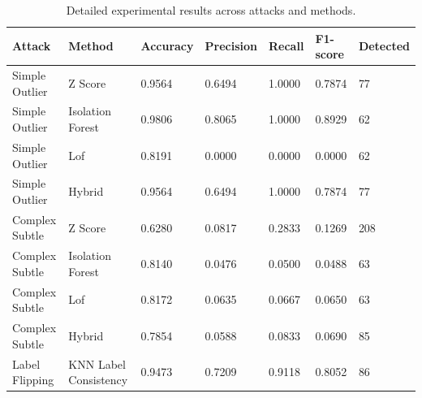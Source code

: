 \begin{table}[H]
\centering
\caption{Detailed experimental results across attacks and methods.}
\label{tab:full_experimental_results}
\begin{tabular}{lllllll}
\hline
Attack & Method & Accuracy & Precision & Recall & F1-score & Detected \\
\hline
Simple Outlier & Z Score & 0.9564 & 0.6494 & 1.0000 & 0.7874 & 77 \\
Simple Outlier & Isolation Forest & 0.9806 & 0.8065 & 1.0000 & 0.8929 & 62 \\
Simple Outlier & Lof & 0.8191 & 0.0000 & 0.0000 & 0.0000 & 62 \\
Simple Outlier & Hybrid & 0.9564 & 0.6494 & 1.0000 & 0.7874 & 77 \\
Complex Subtle & Z Score & 0.6280 & 0.0817 & 0.2833 & 0.1269 & 208 \\
Complex Subtle & Isolation Forest & 0.8140 & 0.0476 & 0.0500 & 0.0488 & 63 \\
Complex Subtle & Lof & 0.8172 & 0.0635 & 0.0667 & 0.0650 & 63 \\
Complex Subtle & Hybrid & 0.7854 & 0.0588 & 0.0833 & 0.0690 & 85 \\
Label Flipping & KNN Label Consistency & 0.9473 & 0.7209 & 0.9118 & 0.8052 & 86 \\
\hline
\end{tabular}
\end{table}
